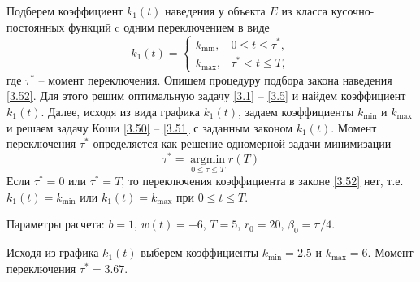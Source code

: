 \documentclass[a4paper,12pt, openany]{book}
\theoremstyle{plain} %
\theoremstyle{definition} %
\theoremstyle{remark} %
\numberwithin{equation}{chapter}
\begin{document}
{Подберем коэффициент $k_1(t)$ наведения у объекта $E$ из класса кусочно-постоянных функций c одним переключением в виде
\begin{equation}\label{3.52}
k_1 \left( t \right) = 
\begin{cases}
   k_{\min } , & 0 \leqslant t \leqslant \tau^* ,  \\
   k_{\max } ,& \tau^*  < t \leqslant T,
\end{cases}
\end{equation}
где $\tau^*$ -- момент переключения. Опишем процедуру подбора закона наведения \eqref{3.52}. Для этого решим оптимальную задачу \eqref{3.1} -- \eqref{3.5} и найдем коэффициент $k_1(t)$. Далее, исходя из вида графика $k_1(t)$, задаем коэффициенты $k_{\min}$ и $k_{\max}$ и решаем задачу Коши \eqref{3.50} -- \eqref{3.51} с заданным законом $k_1(t)$. Момент переключения $\tau^*$ определяется как решение одномерной задачи минимизации
\begin{equation}\label{3.53}
\tau ^*  = \mathop {\mathrm{argmin}}\limits_{0 \leqslant \tau  \leqslant T} r\left( T \right)
\end{equation}
Если $\tau^* = 0$ или $\tau^* = T$, то переключения коэффициента в законе \eqref{3.52} нет, т.е. $k_1(t) = k_{\min}$ или $k_1(t) = k_{\max}$ при $0\leqslant t \leqslant T$. 

\newpage
Параметры расчета: $b = 1$, $w(t) = -6$, $T=5$, $r_0 = 20$, $\beta_0 = \pi/4$.

Исходя из графика $k_1(t)$ выберем коэффициенты $k_{\min} = 2.5$ и $k_{\max} = 6$. Момент переключения $\tau^* = 3.67$. 



\newpage





}
\end{document}
